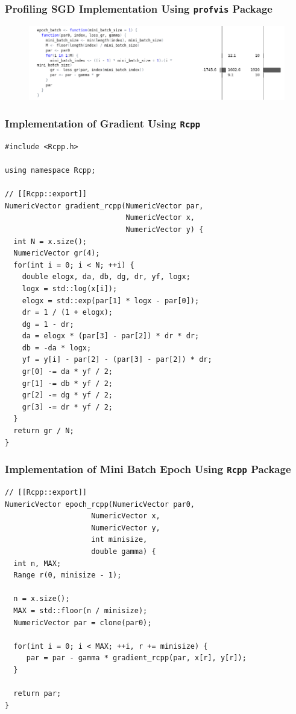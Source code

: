 \documentclass[aspectratio=169]{beamer}
\begin{document}
\begin{frame}
    \frametitle{Profiling SGD Implementation Using \texttt{profvis} Package}
    \begin{figure}
        \centering
        \includegraphics[scale = 0.4]{figure/EpochProf.png}
    \end{figure}
\end{frame}
\begin{frame}[fragile]
    \frametitle{Implementation of Gradient Using \texttt{Rcpp}}
\begin{verbatim}
#include <Rcpp.h>

using namespace Rcpp;

// [[Rcpp::export]]
NumericVector gradient_rcpp(NumericVector par,
                            NumericVector x,
                            NumericVector y) {
  int N = x.size();
  NumericVector gr(4);
  for(int i = 0; i < N; ++i) {
    double elogx, da, db, dg, dr, yf, logx;
    logx = std::log(x[i]);
    elogx = std::exp(par[1] * logx - par[0]);
    dr = 1 / (1 + elogx);
    dg = 1 - dr;
    da = elogx * (par[3] - par[2]) * dr * dr;
    db = -da * logx;
    yf = y[i] - par[2] - (par[3] - par[2]) * dr;
    gr[0] -= da * yf / 2;
    gr[1] -= db * yf / 2;
    gr[2] -= dg * yf / 2;
    gr[3] -= dr * yf / 2;
  }
  return gr / N;
}   
\end{verbatim}
\end{frame}
\begin{frame}[fragile]
    \frametitle{Implementation of Mini Batch Epoch Using \texttt{Rcpp} Package}
\begin{verbatim}
// [[Rcpp::export]]
NumericVector epoch_rcpp(NumericVector par0, 
                    NumericVector x, 
                    NumericVector y,
                    int minisize,
                    double gamma) {
  int n, MAX;
  Range r(0, minisize - 1);
  
  n = x.size();
  MAX = std::floor(n / minisize);
  NumericVector par = clone(par0);
  
  for(int i = 0; i < MAX; ++i, r += minisize) {
     par = par - gamma * gradient_rcpp(par, x[r], y[r]);
  }

  return par;
}
\end{verbatim}
\end{frame}
\end{document}
